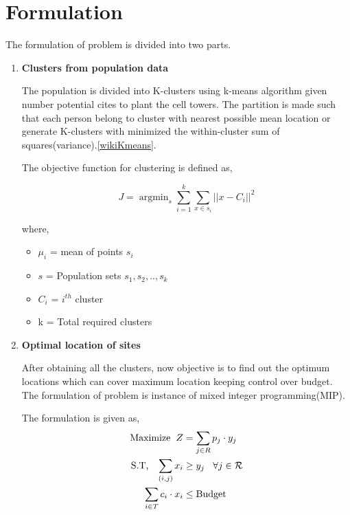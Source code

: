 \documentclass[preprint,12pt]{elsarticle}
\DeclareMathOperator*{\argmin}{argmin}
\begin{document}
\section{Formulation} \label{sec:formulation}
The formulation of problem is divided into two parts.
\begin{enumerate}
\item \textbf{Clusters from population data }

The population is divided into K-clusters using k-means algorithm given number potential cites to plant the cell towers. The partition is made such that each person belong to cluster with nearest possible mean location or generate K-clusters with minimized the within-cluster sum of squares(variance).\ref{wikiKmeans}.

The objective function for clustering is defined as\cite{wikiKmeans},

\begin{equation}
J = \argmin_s \sum_{i=1}^{k} \sum_{x\in s_i} ||x - C_i ||^2
\end{equation}

where,
\begin{itemize}
	\item $\mu_i$ = mean of points $s_i$
	\item $s$ = Population sets ${s_1,s_2,..,s_k} $
	\item $C_i$ = $i^{th}$ cluster
	\item k = Total required clusters
\end{itemize}

\item \textbf{Optimal location of sites}

After obtaining all the clusters, now objective is to find out the optimum locations which can cover maximum location keeping control over budget. The formulation of problem is instance of  mixed integer programming(MIP)\cite{maximal}.

The formulation is given as,
\begin{equation}
	\begin{aligned}
\text{Maximize} \hspace{2mm} Z &= \sum_{j \in R} p_j \cdot y_j \\
\text{S.T,} \hspace{3mm}\sum_{(i,j)} x_i &\geq y_j \hspace{3mm} \forall j \in \mathcal{R} \\
\sum_{i \in T} c_i \cdot x_i &\leq \text{Budget}
\end{aligned}
\end{equation}


\end{enumerate}
\end{document}
